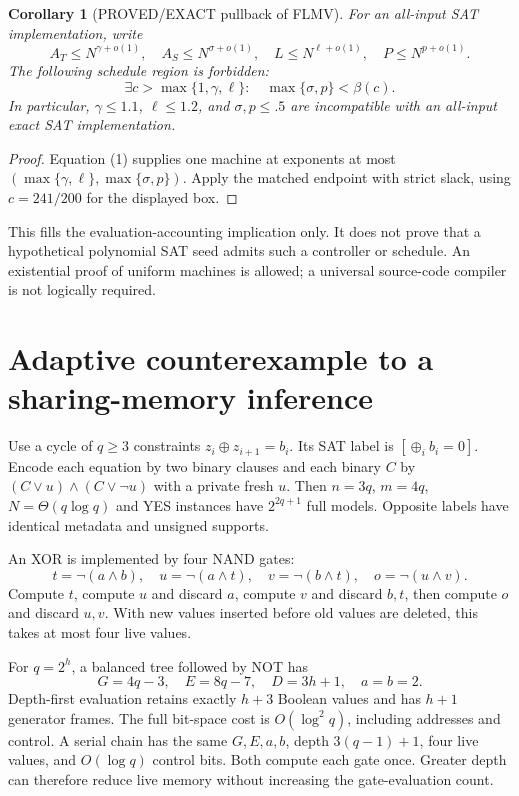 \documentclass[11pt]{article}
\newtheorem{corollary}{Corollary}
\begin{document}
\begin{corollary}[PROVED/EXACT pullback of FLMV]
For an all-input SAT implementation, write
\[
A_T\le N^{\gamma+o(1)},\quad A_S\le N^{\sigma+o(1)},\quad
L\le N^{\ell+o(1)},\quad P\le N^{p+o(1)}.
\]
The following schedule region is forbidden:
\[
\exists c>\max\{1,\gamma,\ell\}:\quad\max\{\sigma,p\}<\beta(c).
\tag{2}
\]
In particular, $\gamma\le1.1$, $\ell\le1.2$, and $\sigma,p\le.5$ are incompatible with an all-input exact SAT implementation.
\end{corollary}
\begin{proof}
Equation (1) supplies one machine at exponents at most $(\max\{\gamma,\ell\},\max\{\sigma,p\})$. Apply the matched endpoint with strict slack, using $c=241/200$ for the displayed box.
\end{proof}
This fills the evaluation-accounting implication only. It does not prove that a hypothetical polynomial SAT seed admits such a controller or schedule. An existential proof of uniform machines is allowed; a universal source-code compiler is not logically required.

\section{Adaptive counterexample to a sharing-memory inference}
Use a cycle of $q\ge3$ constraints $z_i\oplus z_{i+1}=b_i$. Its SAT label is $[\oplus_i b_i=0]$. Encode each equation by two binary clauses and each binary $C$ by $(C\lor u)\land(C\lor\neg u)$ with a private fresh $u$. Then $n=3q$, $m=4q$, $N=\Theta(q\log q)$ and YES instances have $2^{2q+1}$ full models. Opposite labels have identical metadata and unsigned supports.

An XOR is implemented by four NAND gates:
\[
t=\neg(a\land b),\quad u=\neg(a\land t),\quad v=\neg(b\land t),\quad o=\neg(u\land v).
\]
Compute $t$, compute $u$ and discard $a$, compute $v$ and discard $b,t$, then compute $o$ and discard $u,v$. With new values inserted before old values are deleted, this takes at most four live values.

For $q=2^h$, a balanced tree followed by NOT has
\[
G=4q-3,\quad E=8q-7,\quad D=3h+1,\quad a=b=2.
\]
Depth-first evaluation retains exactly $h+3$ Boolean values and has $h+1$ generator frames. The full bit-space cost is $O(\log^2q)$, including addresses and control. A serial chain has the same $G,E,a,b$, depth $3(q-1)+1$, four live values, and $O(\log q)$ control bits. Both compute each gate once. Greater depth can therefore reduce live memory without increasing the gate-evaluation count.
\end{document}
